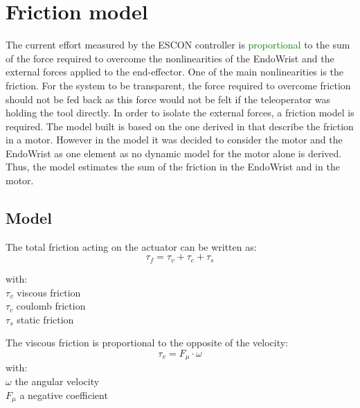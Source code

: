 \section{Friction model}

The current effort measured by the ESCON controller is \textcolor{green}{proportional} to the sum of the force required to overcome the nonlinearities of the EndoWrist and the external forces applied to the end-effector. One of the main nonlinearities is the friction. For the system to be transparent, the force required to overcome friction should not be fed back as this force would not be felt if the teleoperator was holding the tool directly. In order to isolate the external forces, a friction model is required. The model built is based on the one derived in \cite{force_reflection} that describe the friction in a motor. However in the model it was decided to consider the motor and the EndoWrist as one element as no dynamic model for the motor alone is derived. Thus, the model estimates the sum of the friction in the EndoWrist and in the motor.

\subsection{Model}
The total friction acting on the actuator can be written as:
\vspace{9pt}
\begin{equation}
\tau_f = \tau_v + \tau_c + \tau_s
\label{eq:total_friction}
\end{equation} 

with:\\
\hspace*{8mm} $\tau_v$ viscous friction\\
\hspace*{8mm} $\tau_c$ coulomb friction\\
\hspace*{8mm} $\tau_s$ static friction    


The viscous friction is proportional to the opposite of the velocity:
\begin{equation}
\tau_v = F_\mu \cdot \omega
\label{eq:viscous_friction}
\end{equation}
with:\\
\hspace*{8mm}$\omega$ the angular velocity\\
\hspace*{8mm}$F_\mu$ a negative coefficient\\

